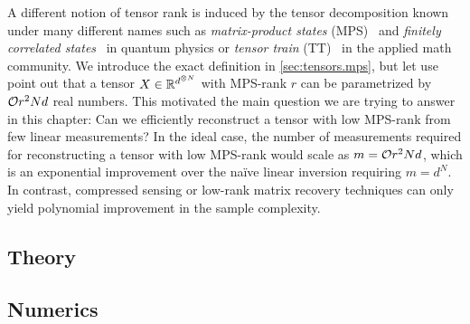 A different notion of tensor rank is induced by the tensor decomposition known under many different names such as \emph{matrix-product states} (MPS)~\cite{Garcia_2006_Matrix,Verstraete_2008_Matrix,Orus_2014_Practical} and \emph{finitely correlated states}~\cite{Fannes_1992_Finitely} in quantum physics or \emph{tensor train} (TT)~\cite{Oseledets_2011_TensorTrain} in the applied math community.
We introduce the exact definition in \cref{sec:tensors.mps}, but let use point out that a tensor $X \in {\mathbb{R}}^{d^{\otimes N}}$ with MPS-rank $r$ can be parametrized by ${\mathcal{O}}{r^2 N d}$ real numbers.
This motivated the main question we are trying to answer in this chapter:
Can we efficiently reconstruct a tensor with low MPS-rank from few linear measurements?
In the ideal case, the number of measurements required for reconstructing a tensor with low MPS-rank would scale as $m = {\mathcal{O}}{r^2 N d}$, which is an exponential improvement over the naïve linear inversion requiring $m = d^N$.
In contrast, compressed sensing or low-rank matrix recovery techniques can only yield polynomial improvement in the sample complexity.


%

\subsection{Theory}%
\subsection{Numerics}%

